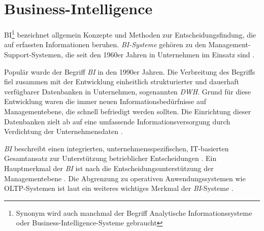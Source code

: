 

\section{Business-Intelligence}
\label{chap:two_three}
\acrfull{BI}\footnote{ Synonym wird auch manchmal der Begriff Analytische Informationssysteme oder Business-Intelligence-Systeme gebraucht}
bezeichnet allgemein Konzepte und Methoden zur Entscheidungsfindung, die auf erfassten Informationen beruhen. 
\textit{\acrlong{BI}-Systeme} gehören zu den Management-Support-Systemen, die seit den 1960er Jahren in Unternehmen im Einsatz sind \cite[vgl.][83]{gronwald_integrierte_2020}.

Populär wurde der Begriff \textit{\acrshort{BI}} in den 1990er Jahren. Die Verbreitung des Begriffs fiel zusammen mit der 
Entwicklung einheitlich strukturierter und dauerhaft verfügbarer Datenbanken in Unternehmen, sogenannten \textit{\acrlong{DWH}}. 
Grund für diese Entwicklung waren die immer neuen Informationsbedürfnisse auf Managementebene, die schnell befriedigt werden sollten.
Die Einrichtung dieser Datenbanken zielt ab auf eine umfassende Informationsversorgung durch Verdichtung der Unternehmensdaten 
\cite[vgl.][268 ff.]{abts_grundkurs_2017}. 

\textit{\acrshort{BI}} beschreibt einen integrierten, unternehmensspezifischen,
IT-basierten Gesamtansatz zur Unterstützung betrieblicher Entscheidungen \cite[vgl.][270]{abts_grundkurs_2017}. 
Ein Hauptmerkmal der \textit{\acrshort{BI}} ist nach  die Entscheidungsunterstützung der Managementebene
\cite[vgl.][111]{linden_geschaftsmodellbasierte_2016}. Die Abgrenzung zu operativen
Anwendungssystemen wie \acrfull{OLTP}-Systemen ist laut \citeauthor{abts_grundkurs_2017} ein weiteres wichtiges Merkmal der \textit{\acrshort{BI}}-Systeme \cite[vgl.][267]{abts_grundkurs_2017}. 

